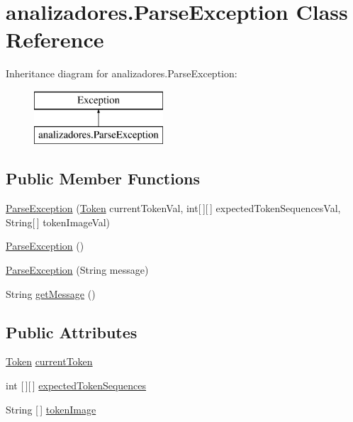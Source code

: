 \hypertarget{classanalizadores_1_1_parse_exception}{}\section{analizadores.\+Parse\+Exception Class Reference}
\label{classanalizadores_1_1_parse_exception}
Inheritance diagram for analizadores.\+Parse\+Exception\+:\begin{figure}[H]
\begin{center}
\leavevmode
\includegraphics[height=2.000000cm]{classanalizadores_1_1_parse_exception}
\end{center}
\end{figure}
\subsection*{Public Member Functions}
\begin{DoxyCompactItemize}
\item 
\mbox{\hyperlink{classanalizadores_1_1_parse_exception_ac9289cbed3fc5347a25e1727070311e9}{Parse\+Exception}} (\mbox{\hyperlink{classanalizadores_1_1_token}{Token}} current\+Token\+Val, int\mbox{[}$\,$\mbox{]}\mbox{[}$\,$\mbox{]} expected\+Token\+Sequences\+Val, String\mbox{[}$\,$\mbox{]} token\+Image\+Val)
\item 
\mbox{\hyperlink{classanalizadores_1_1_parse_exception_ad2caa939d34e9a1a6f550e795468bac9}{Parse\+Exception}} ()
\item 
\mbox{\hyperlink{classanalizadores_1_1_parse_exception_ad521e60f04650096c71062ec8bf0c0a4}{Parse\+Exception}} (String message)
\item 
String \mbox{\hyperlink{classanalizadores_1_1_parse_exception_a6b54780b5e7d3ca5f905cef4a218eff6}{get\+Message}} ()
\end{DoxyCompactItemize}
\subsection*{Public Attributes}
\begin{DoxyCompactItemize}
\item 
\mbox{\hyperlink{classanalizadores_1_1_token}{Token}} \mbox{\hyperlink{classanalizadores_1_1_parse_exception_a5e7dae6899708a852cc7410e52d090f2}{current\+Token}}
\item 
int \mbox{[}$\,$\mbox{]}\mbox{[}$\,$\mbox{]} \mbox{\hyperlink{classanalizadores_1_1_parse_exception_aef57ab03c5f063e50c0eaa6b0e525946}{expected\+Token\+Sequences}}
\item 
String \mbox{[}$\,$\mbox{]} \mbox{\hyperlink{classanalizadores_1_1_parse_exception_a8d39ada57041e6c5b993d2b6fd66d6cc}{token\+Image}}
\end{DoxyCompactItemize}
